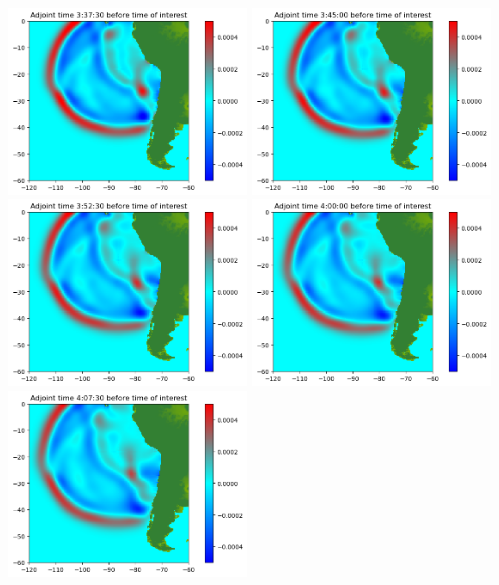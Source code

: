 \documentclass[11pt]{article}
\begin{document}
\vskip 10pt 
\includegraphics[width=0.475\textwidth]{frame0029fig0.png}
\vskip 10pt 
\includegraphics[width=0.475\textwidth]{frame0030fig0.png}
\vskip 10pt 
\includegraphics[width=0.475\textwidth]{frame0031fig0.png}
\vskip 10pt 
\includegraphics[width=0.475\textwidth]{frame0032fig0.png}
\vskip 10pt 
\includegraphics[width=0.475\textwidth]{frame0033fig0.png}
\end{document}

